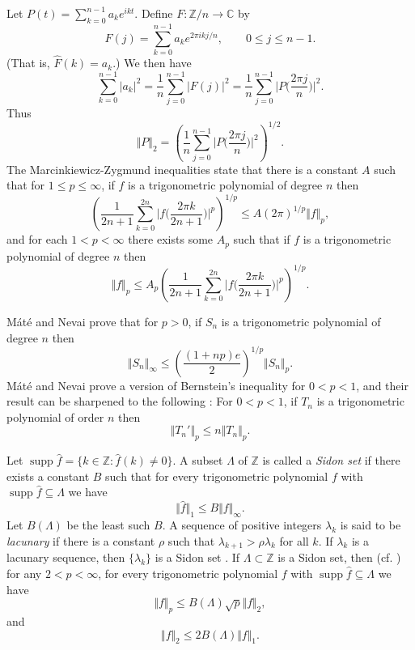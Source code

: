 \documentclass{article}
\newcommand{\norm}[1]{\Vert #1 \Vert}
\newcommand{\supp}{\mathop{\mathrm{supp}}}
\begin{document}
Let $P(t)=\sum_{k=0}^{n-1} a_k e^{ikt}$. Define $F:\mathbb{Z}/n \to \mathbb{C}$ by
\[
F(j)=\sum_{k=0}^{n-1} a_k e^{2\pi ikj/n}, \qquad 0 \leq j \leq n-1.
\]
(That is, $\hat{F}(k)=a_k$.)
We then have 
\[
\sum_{k=0}^{n-1} |a_k|^2=\frac{1}{n}\sum_{j=0}^{n-1} |F(j)|^2 = \frac{1}{n} \sum_{j=0}^{n-1} \big|P\Big(\frac{2\pi j}{n}\Big)\big|^2.
\]
Thus
\[
\norm{P}_2=\left( \frac{1}{n}  \sum_{j=0}^{n-1} \big|P\Big(\frac{2\pi j}{n}\Big)\big|^2 \right)^{1/2}.
\]
The Marcinkiewicz-Zygmund inequalities \cite[vol.~II, p.~28, chap.~X, Theorem~7.5]{zygmund} state that there is a constant $A$ such that 
for $1 \leq p \leq \infty$, if $f$ is a trigonometric polynomial of degree $n$ then
\[
\left( \frac{1}{2n+1} \sum_{k=0}^{2n} \big|f\Big(\frac{2\pi k}{2n+1}\Big)\big|^p \right)^{1/p} \leq A(2\pi)^{1/p} \norm{f}_p,
\]
and for each $1 < p < \infty$ there exists some $A_p$ such that if $f$ is a trigonometric polynomial of degree $n$ then
\[
\norm{f}_p \leq A_p \left( \frac{1}{2n+1} \sum_{k=0}^{2n} \big|f\Big(\frac{2\pi k}{2n+1}\Big)\big|^p \right)^{1/p}.
\]

M{\'a}t{\'e} and Nevai \cite[p.~148, Theorem~6]{MR558399} prove that for $p>0$, if $S_n$ is a trigonometric polynomial of degree $n$ then
\[
\norm{S_n}_\infty \leq \left( \frac{(1+np)e}{2} \right)^{1/p} \norm{S_n}_p.
\]
M{\'a}t{\'e} and Nevai \cite{MR558399} prove a version of Bernstein's inequality for $0<p<1$, and their result
can be sharpened to the following \cite{MR1016168}: For $0<p<1$, if $T_n$ is a trigonometric polynomial
of order $n$ then
\[
\norm{T_n'}_p \leq n \norm{T_n}_p.
\]

Let $\supp \hat{f}=\{k \in \mathbb{Z}: \hat{f}(k) \neq 0\}$. A subset $\Lambda$ of $\mathbb{Z}$ is called a {\em Sidon set}  \cite[p.~121, \S 5.7.2]{groups} if there exists a constant $B$
such that for every trigonometric polynomial $f$ with $\supp \hat{f} \subseteq \Lambda$ we have
\[
\norm{\hat{f}}_1 \leq B \norm{f}_\infty.
\]
Let $B(\Lambda)$ be the least such $B$.
A sequence of positive integers $\lambda_k$ is said to be {\em lacunary} if there is a constant $\rho$ such that $\lambda_{k+1} > \rho \lambda_k$ for all
$k$. If $\lambda_k$ is a lacunary sequence, then $\{\lambda_k\}$ is a Sidon set \cite[p.~154, Corollary~6.17]{schlag}. 
If $\Lambda \subset \mathbb{Z}$ is a Sidon set, then \cite[p.~128, Theorem~5.7.7]{groups} (cf. \cite[p.~157, Corollary~6.19]{schlag}) for any $2 < p < \infty$,
for every trigonometric polynomial $f$ with $\supp \hat{f} \subseteq \Lambda$ we have 
\[
\norm{f}_p \leq B(\Lambda) \sqrt{p} \norm{f}_2,
\]
and
\[
\norm{f}_2 \leq 2B(\Lambda) \norm{f}_1.
\]
\end{document}

